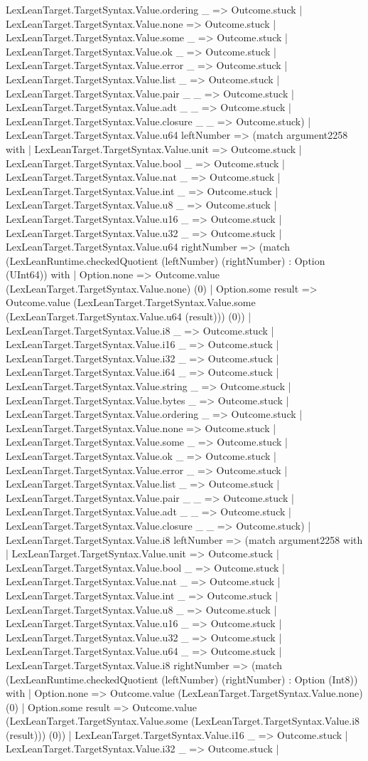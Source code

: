 \documentclass[11pt]{article}
\begin{document}
LexLeanTarget.TargetSyntax.Value.ordering \_ => Outcome.stuck | LexLeanTarget.TargetSyntax.Value.none => Outcome.stuck | LexLeanTarget.TargetSyntax.Value.some \_ => Outcome.stuck | LexLeanTarget.TargetSyntax.Value.ok \_ => Outcome.stuck | LexLeanTarget.TargetSyntax.Value.error \_ => Outcome.stuck | LexLeanTarget.TargetSyntax.Value.list \_ => Outcome.stuck | LexLeanTarget.TargetSyntax.Value.pair \_ \_ => Outcome.stuck | LexLeanTarget.TargetSyntax.Value.adt \_ \_ => Outcome.stuck | LexLeanTarget.TargetSyntax.Value.closure \_ \_ => Outcome.stuck) | LexLeanTarget.TargetSyntax.Value.u64 leftNumber => (match argument2258 with | LexLeanTarget.TargetSyntax.Value.unit => Outcome.stuck | LexLeanTarget.TargetSyntax.Value.bool \_ => Outcome.stuck | LexLeanTarget.TargetSyntax.Value.nat \_ => Outcome.stuck | LexLeanTarget.TargetSyntax.Value.int \_ => Outcome.stuck | LexLeanTarget.TargetSyntax.Value.u8 \_ => Outcome.stuck | LexLeanTarget.TargetSyntax.Value.u16 \_ => Outcome.stuck | LexLeanTarget.TargetSyntax.Value.u32 \_ => Outcome.stuck | LexLeanTarget.TargetSyntax.Value.u64 rightNumber => (match (LexLeanRuntime.checkedQuotient (leftNumber) (rightNumber) : Option (UInt64)) with | Option.none => Outcome.value (LexLeanTarget.TargetSyntax.Value.none) (0) | Option.some result => Outcome.value (LexLeanTarget.TargetSyntax.Value.some (LexLeanTarget.TargetSyntax.Value.u64 (result))) (0)) | LexLeanTarget.TargetSyntax.Value.i8 \_ => Outcome.stuck | LexLeanTarget.TargetSyntax.Value.i16 \_ => Outcome.stuck | LexLeanTarget.TargetSyntax.Value.i32 \_ => Outcome.stuck | LexLeanTarget.TargetSyntax.Value.i64 \_ => Outcome.stuck | LexLeanTarget.TargetSyntax.Value.string \_ => Outcome.stuck | LexLeanTarget.TargetSyntax.Value.bytes \_ => Outcome.stuck | LexLeanTarget.TargetSyntax.Value.ordering \_ => Outcome.stuck | LexLeanTarget.TargetSyntax.Value.none => Outcome.stuck | LexLeanTarget.TargetSyntax.Value.some \_ => Outcome.stuck | LexLeanTarget.TargetSyntax.Value.ok \_ => Outcome.stuck | LexLeanTarget.TargetSyntax.Value.error \_ => Outcome.stuck | LexLeanTarget.TargetSyntax.Value.list \_ => Outcome.stuck | LexLeanTarget.TargetSyntax.Value.pair \_ \_ => Outcome.stuck | LexLeanTarget.TargetSyntax.Value.adt \_ \_ => Outcome.stuck | LexLeanTarget.TargetSyntax.Value.closure \_ \_ => Outcome.stuck) | LexLeanTarget.TargetSyntax.Value.i8 leftNumber => (match argument2258 with | LexLeanTarget.TargetSyntax.Value.unit => Outcome.stuck | LexLeanTarget.TargetSyntax.Value.bool \_ => Outcome.stuck | LexLeanTarget.TargetSyntax.Value.nat \_ => Outcome.stuck | LexLeanTarget.TargetSyntax.Value.int \_ => Outcome.stuck | LexLeanTarget.TargetSyntax.Value.u8 \_ => Outcome.stuck | LexLeanTarget.TargetSyntax.Value.u16 \_ => Outcome.stuck | LexLeanTarget.TargetSyntax.Value.u32 \_ => Outcome.stuck | LexLeanTarget.TargetSyntax.Value.u64 \_ => Outcome.stuck | LexLeanTarget.TargetSyntax.Value.i8 rightNumber => (match (LexLeanRuntime.checkedQuotient (leftNumber) (rightNumber) : Option (Int8)) with | Option.none => Outcome.value (LexLeanTarget.TargetSyntax.Value.none) (0) | Option.some result => Outcome.value (LexLeanTarget.TargetSyntax.Value.some (LexLeanTarget.TargetSyntax.Value.i8 (result))) (0)) | LexLeanTarget.TargetSyntax.Value.i16 \_ => Outcome.stuck | LexLeanTarget.TargetSyntax.Value.i32 \_ => Outcome.stuck | 
\end{document}
